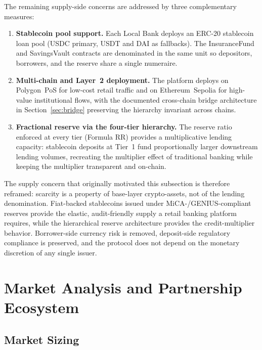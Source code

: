 \documentclass[12pt,a4paper]{report}
\begin{document}
The remaining supply-side concerns are addressed by three complementary measures:

\begin{enumerate}[noitemsep]
\item \textbf{Stablecoin pool support.} Each Local Bank deploys an ERC-20 stablecoin loan pool (USDC primary, USDT and DAI as fallbacks). The InsuranceFund and SavingsVault contracts are denominated in the same unit so depositors, borrowers, and the reserve share a single numeraire.
\item \textbf{Multi-chain and Layer~2 deployment.} The platform deploys on Polygon~PoS for low-cost retail traffic and on Ethereum~Sepolia for high-value institutional flows, with the documented cross-chain bridge architecture in Section~\ref{sec:bridge} preserving the hierarchy invariant across chains.
\item \textbf{Fractional reserve via the four-tier hierarchy.} The reserve ratio enforced at every tier (Formula RR) provides a multiplicative lending capacity: stablecoin deposits at Tier~1 fund proportionally larger downstream lending volumes, recreating the multiplier effect of traditional banking while keeping the multiplier transparent and on-chain.
\end{enumerate}

The supply concern that originally motivated this subsection is therefore reframed: scarcity is a property of base-layer crypto-assets, not of the lending denomination. Fiat-backed stablecoins issued under MiCA-/GENIUS-compliant reserves provide the elastic, audit-friendly supply a retail banking platform requires, while the hierarchical reserve architecture provides the credit-multiplier behavior. Borrower-side currency risk is removed, deposit-side regulatory compliance is preserved, and the protocol does not depend on the monetary discretion of any single issuer.

\section{Market Analysis and Partnership Ecosystem}

\subsection{Market Sizing}
\end{document}
